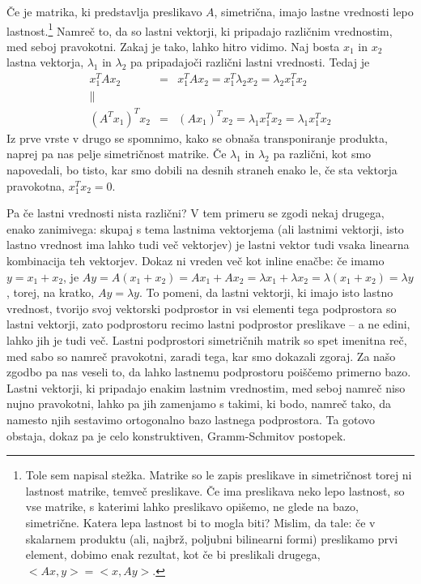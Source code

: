 Če je matrika, ki predstavlja preslikavo $A$, simetrična, imajo lastne vrednosti lepo lastnost.\footnote{Tole sem napisal stežka. Matrike so le zapis preslikave in simetričnost torej ni lastnost matrike, temveč preslikave. Če ima preslikava neko lepo lastnost, so vse matrike, s katerimi lahko preslikavo opišemo, ne glede na bazo, simetrične. Katera lepa lastnost bi to mogla biti? Mislim, da tale: če v skalarnem produktu (ali, najbrž, poljubni bilinearni formi) preslikamo prvi element, dobimo enak rezultat, kot če bi preslikali drugega, $<Ax, y>=<x, Ay>$.} Namreč to, da so lastni vektorji, ki pripadajo različnim vrednostim, med seboj pravokotni. Zakaj je tako, lahko hitro vidimo. Naj bosta $x_1$ in $x_2$ lastna vektorja, $\lambda_1$ in $\lambda_2$ pa pripadajoči različni lastni vrednosti. Tedaj je 
\begin{eqnarray}
x_1^T A x_2 & = & x_1^T A x_2 = x_1^T \lambda_2 x_2 = \lambda_2 x_1^T x_2\\
\parallel \\
(A^T x_1)^T x_2 & = &  (A x_1)^T x_2 = \lambda_1 x_1^T  x_2 = \lambda_1 x_1^T x_2
\end{eqnarray}
Iz prve vrste v drugo se spomnimo, kako se obnaša transponiranje produkta, naprej pa nas pelje simetričnost matrike. Če $\lambda_1$ in $\lambda_2$ pa različni, kot smo napovedali, bo tisto, kar smo dobili na desnih straneh enako le, če sta vektorja pravokotna, $x_1^T x_2=0$.

Pa če lastni vrednosti nista različni? V tem primeru se zgodi nekaj drugega, enako zanimivega: skupaj s tema lastnima vektorjema (ali lastnimi vektorji, isto lastno vrednost ima lahko tudi več vektorjev) je lastni vektor tudi vsaka linearna kombinacija teh vektorjev. Dokaz ni vreden več kot inline enačbe: če imamo $y=x_1+x_2$, je $Ay=A(x_1+x_2)=Ax_1+Ax_2=\lambda x_1+\lambda x_2=\lambda (x_1+x_2)=\lambda y$, torej, na kratko, $Ay=\lambda y$. To pomeni, da lastni vektorji, ki imajo isto lastno vrednost, tvorijo svoj vektorski podprostor in vsi elementi tega podprostora so lastni vektorji, zato podprostoru recimo lastni podprostor preslikave -- a ne edini, lahko jih je tudi več. Lastni podprostori simetričnih matrik so spet imenitna reč, med sabo so namreč pravokotni, zaradi tega, kar smo dokazali zgoraj. Za našo zgodbo pa nas veseli to, da lahko lastnemu podprostoru poiščemo primerno bazo. Lastni vektorji, ki pripadajo enakim lastnim vrednostim, med seboj namreč niso nujno pravokotni, lahko pa jih zamenjamo s takimi, ki bodo, namreč tako, da namesto njih sestavimo ortogonalno bazo lastnega podprostora. Ta gotovo obstaja, dokaz pa je celo konstruktiven, Gramm-Schmitov postopek.

